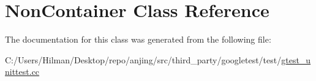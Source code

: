 \hypertarget{class_non_container}{}\section{Non\+Container Class Reference}
\label{class_non_container}


The documentation for this class was generated from the following file\+:\begin{DoxyCompactItemize}
\item 
C\+:/\+Users/\+Hilman/\+Desktop/repo/anjing/src/third\+\_\+party/googletest/test/\hyperlink{gtest__unittest_8cc}{gtest\+\_\+unittest.\+cc}\end{DoxyCompactItemize}
